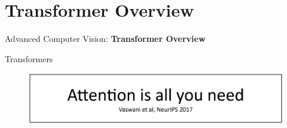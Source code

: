 \section{Transformer Overview}
\begin{frame}{}
    \LARGE Advanced Computer Vision: \textbf{Transformer Overview}
\end{frame}

\begin{frame}{Transformers}

\begin{figure}
\centering
\includegraphics[width=1.0\textwidth,height=1.0\textheight,keepaspectratio]{images/advanced-cv/transformers_1.png}
\end{figure} 
    
\end{frame}

